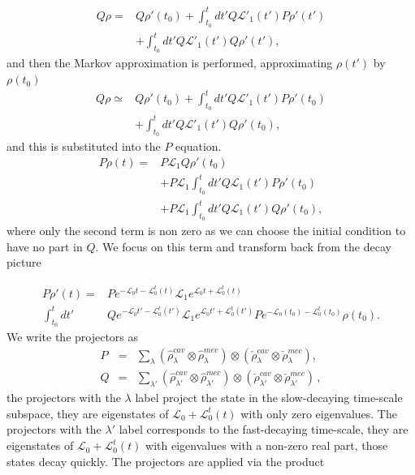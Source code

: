\documentclass[reprint, amsmath,amssymb, aps,pra]{revtex4-1}
\begin{document}
\begin{align*}
Q\rho =& Q\rho'(t_0) + \int_{t_0}^{t}dt' Q\mathcal{L}'_1(t')P\rho'(t')\\
       &+\int_{t_0}^{t}dt'Q\mathcal{L}'_1(t')Q\rho'(t'),
\end{align*}
 and then the Markov approximation is performed, approximating $\rho(t')$ by $\rho(t_0)$
\begin{align*}
Q\rho\simeq & Q\rho'(t_0) + \int_{t_0}^{t}dt' Q\mathcal{L}'_1(t')P\rho'(t_0)\\
       &+\int_{t_0}^{t}dt'Q\mathcal{L}'_1(t')Q\rho'(t_0),
\end{align*}
and this is substituted into the $P$ equation. 
\begin{align}
P\dot{\rho}(t) =& P\mathcal{L}_1Q\rho'(t_0)\\ 
 &+ P\mathcal{L}_1\int_{t_0}^{t}dt' Q\mathcal{L}_1(t')P\rho'(t_0)\nonumber \\
 &+ P\mathcal{L}_1\int_{t_0}^{t}dt'Q\mathcal{L}_1(t')Q\rho'(t_0)\nonumber,
\end{align}
where only the second term is non zero as we can choose the initial condition to have no part in $Q$. We focus on this term and transform back from the decay
picture


\begin{align}\label{eq:temp_1}
P\dot{\rho}'(t)=&P e^{-\mathcal{L}_0 t-\mathcal{L}_0^t(t)}\mathcal{L}_1e^{\mathcal{L}_0 t+\mathcal{L}_0^t(t)}\\
\int_{t_0}^{t}dt'&Qe^{-\mathcal{L}_0 t'-\mathcal{L}_0^t(t')}\mathcal{L}_1e^{\mathcal{L}_0 t'+\mathcal{L}_0^t(t')}Pe^{-\mathcal{L}_0(t_0)-\mathcal{L}_0^t(t_0)}\rho(t_0).\nonumber
\end{align} We write the projectors as
\begin{eqnarray}
  P &=& \sum_{\lambda} (\hat{\rho}_{\lambda}^{cav}\otimes\hat{\rho}_{\lambda}^{mec})\otimes(\check{\rho}_{\lambda}^{cav}\otimes\check{\rho}_{\lambda}^{mec}),\label{eq:projector_p}\\
  Q &=& \sum_{\lambda'} (\hat{\rho}_{\lambda'}^{cav}\otimes \hat{\rho}_{\lambda'}^{mec})\otimes(\check{\rho}_{\lambda'}^{cav}\otimes\check{\rho}_{\lambda'}^{mec})\label{eq:projector_q}\, ,
\end{eqnarray}
the projectors with the $\lambda$ label project the state in the
slow-decaying time-scale subspace, they are eigenstates of
$\mathcal{L}_0+\mathcal{L}_0^t(t)$ with only zero eigenvalues. The projectors with the
$\lambda'$ label corresponds to the fast-decaying time-scale, they are
eigenstates of $\mathcal{L}_0+\mathcal{L}_0^t(t)$ with eigenvalues with a non-zero real
part, those states decay quickly. The projectors are applied via the product
\end{document}
